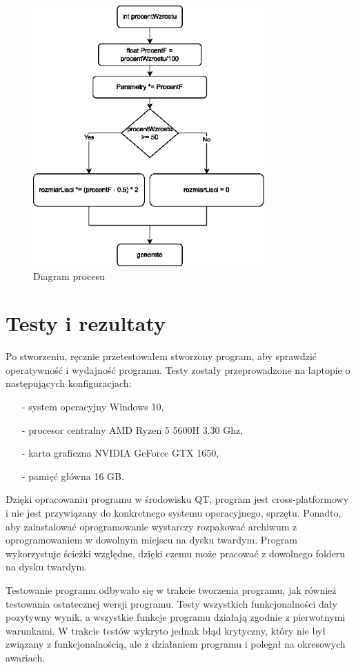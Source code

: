 \documentclass[a4paper,12pt,twoside]{book} %
\begin{document}
\begin{figure}[H]
	\centering\includegraphics[height=10cm]{grafika/diagrams/flow}
	\caption{Diagram procesu}
    \label{fig:flowDiagram}
\end{figure}

\chapter{Testy i rezultaty}

Po stworzeniu, ręcznie przetestowałem stworzony program, 
aby sprawdzić operatywność i wydajność programu. 
Testy zostały przeprowadzone na laptopie o 
następujących konfiguracjach:
\begin{itemize}
	\item[-] system operacyjny Windows 10,
	\item[-] procesor centralny AMD Ryzen 5 5600H 3.30 Ghz,
	\item[-] karta graficzna NVIDIA GeForce GTX 1650,
	\item[-] pamięć główna 16 GB. 
\end{itemize}

Dzięki opracowaniu programu w środowisku QT, 
program jest cross-platformowy i nie jest przywiązany 
do konkretnego systemu operacyjnego, sprzętu. 
Ponadto, aby zainstalować oprogramowanie wystarczy 
rozpakować archiwum z oprogramowaniem w dowolnym miejscu 
na dysku twardym. Program wykorzystuje ścieżki względne, 
dzięki czemu może pracować z dowolnego folderu 
na dysku twardym. 

Testowanie programu odbywało się w trakcie tworzenia programu, 
jak również testowania ostatecznej wersji programu. 
Testy wszystkich funkcjonalności dały pozytywny wynik, 
a wszystkie funkcje programu działają zgodnie z pierwotnymi 
warunkami. W trakcie testów wykryto jednak błąd krytyczny, 
który nie był związany z funkcjonalnością, ale z 
działaniem programu i polegał na okresowych awariach.  
\end{document}
